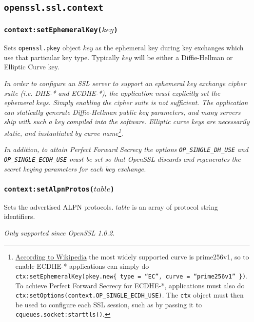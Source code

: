 \documentclass[11pt, oneside]{memoir}
\newcommand*{\fn}[1]{\texttt{#1}\xspace}
\newcommand*{\module}[1]{\texttt{#1}\xspace}
\newcounter{toccols}
\newenvironment{Module}[1]{
	\subsection{\texttt{#1}}
	\addtocontents{toc}{
		\protect\begin{multicols}{\value{toccols}}
	}
}{
	\addtocontents{toc}{\protect\end{multicols}}
}
\begin{document}
\begin{Module}{openssl.ssl.context}
\subsubsection[\fn{context:setEphemeralKey}]{\fn{context:setEphemeralKey($key$)}}

Sets \module{openssl.pkey} object $key$ as the ephemeral key during key exchanges which use that particular key type. Typically $key$ will be either a Diffie-Hellman or Elliptic Curve key.

\emph{In order to configure an SSL server to support an ephemeral key exchange cipher suite (i.e. DHE-* and ECDHE-*), the application must explicitly set the ephemeral keys. Simply enabling the cipher suite is not sufficient. The application can statically generate Diffie-Hellman public key parameters, and many servers ship with such a key compiled into the software. Elliptic curve keys are necessarily static, and instantiated by curve name\footnote{\href{http://en.wikipedia.org/w/index.php?title=Comparison\_of\_TLS\_implementations&oldid=629779090\#Supported\_elliptic\_curves}{According to Wikipedia} the most widely supported curve is prime256v1, so to enable ECDHE-* applications can simply do \texttt{ctx:setEphemeralKey(pkey.new\{ type = ``EC'', curve = ``prime256v1'' \})}. To achieve Perfect Forward Secrecy for ECDHE-*, applications must also do \texttt{ctx:setOptions(context.OP\_SINGLE\_ECDH\_USE)}. The \texttt{ctx} object must then be used to configure each SSL session, such as by passing it to \fn{cqueues.socket:starttls()}.}.}

\emph{In addition, to attain Perfect Forward Secrecy the options \texttt{OP\_SINGLE\_DH\_USE} and \texttt{OP\_SINGLE\_ECDH\_USE} must be set so that OpenSSL discards and regenerates the secret keying parameters for each key exchange.}

\subsubsection[\fn{context:setAlpnProtos}]{\fn{context:setAlpnProtos($table$)}}

Sets the advertised ALPN protocols. $table$ is an array of protocol string identifiers.

\emph{Only supported since OpenSSL 1.0.2.}

\end{Module}
\end{document}
